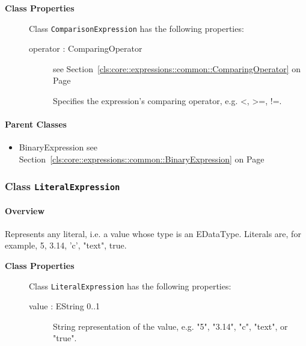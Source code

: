 	


\begin{description}

	\item[\textbf{Class Properties}] Class \texttt{ComparisonExpression} has the following properties:
	\begin{description}
\item[operator : ComparingOperator 	]
see Section~\ref{cls:core::expressions::common::ComparingOperator} on Page~\pageref{cls:core::expressions::common::ComparingOperator}
\hspace{\fill}
\nopagebreak


	
			
Specifies the expression's comparing operator, e.g. <, >=, !=.	
		
	
	\end{description}
	
	

\end{description}

\paragraph{Parent Classes}
\begin{itemize}
\item BinaryExpression see Section~\ref{cls:core::expressions::common::BinaryExpression} on Page~\pageref{cls:core::expressions::common::BinaryExpression}\end{itemize}
\subsubsection{\Large{Class \bfseries \texttt{LiteralExpression}\normalfont}}
\label{cls:core::expressions::common::LiteralExpression} 
\paragraph{Overview}

	
			
Represents any literal, i.e. a value whose type is an EDataType. Literals are, for example, 5, 3.14, 'c', "text", true.	
		
	


\begin{description}

	\item[\textbf{Class Properties}] Class \texttt{LiteralExpression} has the following properties:
	\begin{description}
\item[value : EString 			0..1]

\hspace{\fill}
\nopagebreak


	
			
String representation of the value, e.g. "5", "3.14", "c", "text", or "true".	
		
	
	\end{description}
	
	

\end{description}

